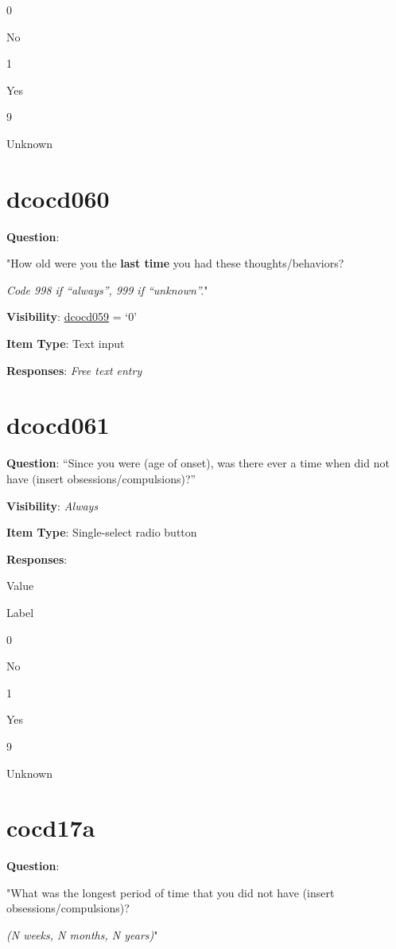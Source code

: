 \documentclass[]{book}
\begin{document}
0

No

1

Yes

9

Unknown

\hypertarget{dcocd060}{%
\section{dcocd060}\label{dcocd060}}

\textbf{Question}:

"How old were you the \textbf{last time} you had these thoughts/behaviors?

\emph{Code 998 if ``always'', 999 if ``unknown''.}"

\textbf{Visibility}: \protect\hyperlink{dcocd059}{dcocd059} = `0'

\textbf{Item Type}: Text input

\textbf{Responses}: \emph{Free text entry}

\hypertarget{dcocd061}{%
\section{dcocd061}\label{dcocd061}}

\textbf{Question}: ``Since you were (age of onset), was there ever a time when did not have (insert obsessions/compulsions)?''

\textbf{Visibility}: \emph{Always}

\textbf{Item Type}: Single-select radio button

\textbf{Responses}:

Value

Label

0

No

1

Yes

9

Unknown

\hypertarget{cocd17a}{%
\section{cocd17a}\label{cocd17a}}

\textbf{Question}:

"What was the longest period of time that you did not have (insert obsessions/compulsions)?

\emph{(N weeks, N months, N years)}"
\end{document}
